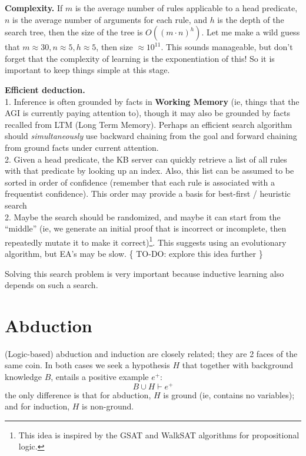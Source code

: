 \textbf{Complexity.}  If $m$ is the average number of rules applicable to a head predicate, $n$ is the average number of arguments for each rule, and $h$ is the depth of the search tree, then the size of the tree is $O((m \cdot n)^h)$.  Let me make a wild guess that $m \approx 30, n \approx 5, h \approx 5$, then size $\approx 10^{11}$.  This sounds manageable, but don't forget that the complexity of learning is the exponentiation of this!  So it is important to keep things simple at this stage.

\textbf{Efficient deduction.}\\
1.  Inference is often grounded by facts in \textbf{Working Memory} (ie, things that the AGI is currently paying attention to), though it may also be grounded by facts recalled from LTM (Long Term Memory).  Perhaps an efficient search algorithm should \textit{simultaneously} use backward chaining from the goal and forward chaining from ground facts under current attention.\\
2.  Given a head predicate, the KB server can quickly retrieve a list of all rules with that predicate by looking up an index.  Also, this list can be assumed to be sorted in order of confidence (remember that each rule is associated with a frequentist confidence).  This order may provide a basis for best-first / heuristic search\\
2.  Maybe the search should be randomized, and maybe it can start from the ``middle'' (ie, we generate an initial proof that is incorrect or incomplete, then repeatedly mutate it to make it correct)\footnote{This idea is inspired by the GSAT and WalkSAT algorithms for propositional logic.}.  This suggests using an evolutionary algorithm, but EA's may be slow. \{ TO-DO:  explore this idea further \}

Solving this search problem is very important because inductive learning also depends on such a search.

\section{Abduction}
\label{sec:abduction}

(Logic-based) abduction and induction are closely related;  they are 2 faces of the same coin.  In both cases we seek a hypothesis $H$ that together with background knowledge $B$, entails a positive example $e^+$:
$$ B \cup H \vdash e^+ $$
the only difference is that for abduction, $H$ is ground (ie, contains no variables); and for induction, $H$ is non-ground.

